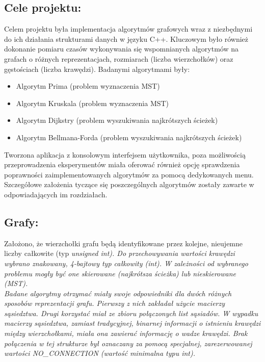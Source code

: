 \documentclass[a4paper,12pt]{article}
\begin{document}
\subsection{Cele projektu:}
Celem projektu była implementacja algorytmów grafowych wraz z niezbędnymi do ich działania strukturami danych w języku C++. Kluczowym było również dokonanie pomiaru czasów wykonywania się wspomnianych algorytmów na grafach o różnych reprezentacjach, rozmiarach (liczba wierzchołków) oraz gęstościach (liczba krawędzi). Badanymi algorytmami były:
\begin{itemize}
	\item Algorytm Prima (problem wyznaczenia MST)
	\item Algorytm Kruskala (problem wyznaczenia MST)
	\item Algorytm Dijkstry (problem wyszukiwania najkrótszych ścieżek)
	\item Algorytm Bellmana-Forda (problem wyszukiwania najkrótszych ścieżek)
\end{itemize}
\vspace{5mm}

\noindent
Tworzona aplikacja z konsolowym interfejsem użytkownika, poza możliwością przeprowadzenia eksperymentów miała oferować również opcję sprawdzenia poprawności zaimplementowanych algorytmów za pomocą dedykowanych menu.\\

\noindent
Szczegółowe założenia tyczące się poszczególnych algorytmów zostały zawarte w odpowiadających im rozdziałach.

\subsection{Grafy:}
Założono, że wierzchołki grafu będą identyfikowane przez kolejne, nieujemne liczby całkowite (typ \it unsigned int\rm). Do przechowywania wartości krawędzi wybrano znakowany, 4-bajtowy typ całkowity (\it int\rm). W zależności od wybranego problemu mogły być one skierowane (najkrótsza ścieżka) lub nieskierowane (MST).\\

\noindent
Badane algorytmy otrzymać miały swoje odpowiedniki dla dwóch różnych sposobów reprezentacji grafu. Pierwszy z nich zakładał użycie macierzy sąsiedztwa. Drugi korzystać miał ze zbioru połączonych list sąsiadów. W wypadku macierzy sąsiedztwa, zamiast tradycyjnej, binarnej informacji o istnieniu krawędzi między wierzchołkami, miała ona zawierać informację o wadze krawędzi. Brak połączenia w tej strukturze był oznaczany za pomocą specjalnej, zarezerwowanej wartości NO\_CONNECTION (wartość minimalna typu \it int\rm).\\
\end{document}
